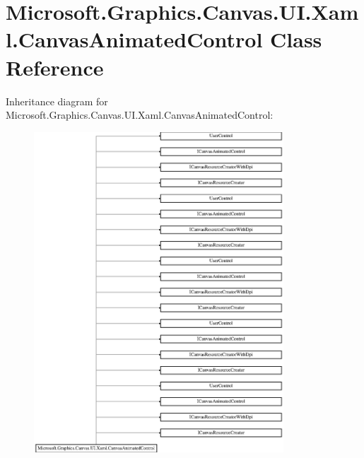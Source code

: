 \hypertarget{class_microsoft_1_1_graphics_1_1_canvas_1_1_u_i_1_1_xaml_1_1_canvas_animated_control}{}\section{Microsoft.\+Graphics.\+Canvas.\+U\+I.\+Xaml.\+Canvas\+Animated\+Control Class Reference}
\label{class_microsoft_1_1_graphics_1_1_canvas_1_1_u_i_1_1_xaml_1_1_canvas_animated_control}
Inheritance diagram for Microsoft.\+Graphics.\+Canvas.\+U\+I.\+Xaml.\+Canvas\+Animated\+Control\+:\begin{figure}[H]
\begin{center}
\leavevmode
\includegraphics[height=12.000000cm]{class_microsoft_1_1_graphics_1_1_canvas_1_1_u_i_1_1_xaml_1_1_canvas_animated_control}
\end{center}
\end{figure}
